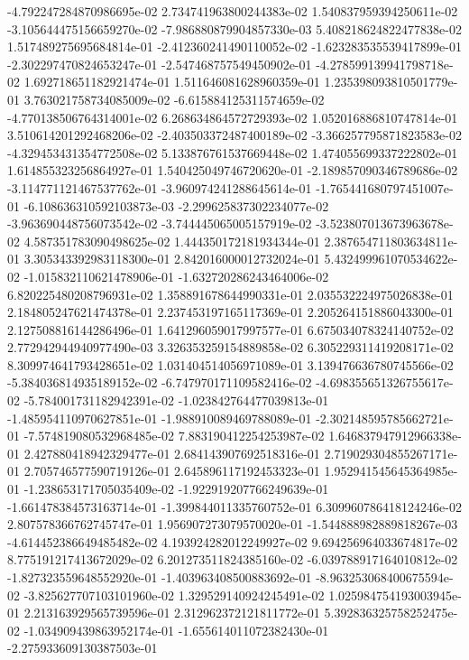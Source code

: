 -4.792247284870986695e-02
2.734741963800244383e-02
1.540837959394250611e-02
-3.105644475156659270e-02
-7.986880879904857330e-03
5.408218624822477838e-02
1.517489275695684814e-01
-2.412360241490110052e-02
-1.623283535539417899e-01
-2.302297470824653247e-01
-2.547468757549450902e-01
-4.278599139941798718e-02
1.692718651182921474e-01
1.511646081628960359e-01
1.235398093810501779e-01
3.763021758734085009e-02
-6.615884125311574659e-02
-4.770138506764314001e-02
6.268634864572729393e-02
1.052016886810747814e-01
3.510614201292468206e-02
-2.403503372487400189e-02
-3.366257795871823583e-02
-4.329453431354772508e-02
5.133876761537669448e-02
1.474055699337222802e-01
1.614855323256864927e-01
1.540425049746720620e-01
-2.189857090346789686e-02
-3.114771121467537762e-01
-3.960974241288645614e-01
-1.765441680797451007e-01
-6.108636310592103873e-03
-2.299625837302234077e-02
-3.963690448756073542e-02
-3.744445065005157919e-02
-3.523807013673963678e-02
4.587351783090498625e-02
1.444350172181934344e-01
2.387654711803634811e-01
3.305343392983118300e-01
2.842016000012732024e-01
5.432499961070534622e-02
-1.015832110621478906e-01
-1.632720286243464006e-02
6.820225480208796931e-02
1.358891678644990331e-01
2.035532224975026838e-01
2.184805247621474378e-01
2.237453197165117369e-01
2.205264151886043300e-01
2.127508816144286496e-01
1.641296059017997577e-01
6.675034078324140752e-02
2.772942944940977490e-03
3.326353259154889858e-02
6.305229311419208171e-02
8.309974641793428651e-02
1.031404514056971089e-01
3.139476636780745566e-02
-5.384036814935189152e-02
-6.747970171109582416e-02
-4.698355651326755617e-02
-5.784001731182942391e-02
-1.023842764477039813e-01
-1.485954110970627851e-01
-1.988910089469788089e-01
-2.302148595785662721e-01
-7.574819080532968485e-02
7.883190412254253987e-02
1.646837947912966338e-01
2.427880418942329477e-01
2.684143907692518316e-01
2.719029304855267171e-01
2.705746577590719126e-01
2.645896117192453323e-01
1.952941545645364985e-01
-1.238653171705035409e-02
-1.922919207766249639e-01
-1.661478384573163714e-01
-1.399844011335760752e-01
6.309960786418124246e-02
2.807578366762745747e-01
1.956907273079570020e-01
-1.544888982889818267e-03
-4.614452386649485482e-02
4.193924282012249927e-02
9.694256964033674817e-02
8.775191217413672029e-02
6.201273511824385160e-02
-6.039788917164010812e-02
-1.827323559648552920e-01
-1.403963408500883692e-01
-8.963253068400675594e-02
-3.825627707103101960e-02
1.329529140924245491e-02
1.025984754193003945e-01
2.213163929565739596e-01
2.312962372121811772e-01
5.392836325758252475e-02
-1.034909439863952174e-01
-1.655614011072382430e-01
-2.275933609130387503e-01
